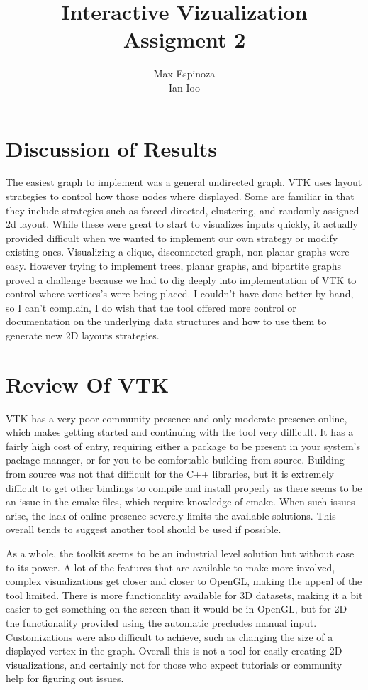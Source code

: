 \documentclass[11pt]{article}
\title{\textbf{Interactive Vizualization}
\\
\normalsize{Assigment 2}
}
\author{Max Espinoza\\
		Ian Ioo}
\begin{document}
\maketitle


\section{Discussion of Results}

The easiest graph to implement was a general undirected graph. VTK uses layout strategies to control how those nodes where displayed. Some are familiar in that they include strategies such as forced-directed, clustering, and randomly assigned 2d layout. While these were great to start to visualizes inputs quickly, it actually provided difficult when we wanted to implement our own strategy or modify existing ones. Visualizing a clique, disconnected graph, non planar graphs were easy. However trying to implement trees, planar graphs, and bipartite graphs proved a challenge because we had to dig deeply into implementation of VTK to control where vertices's were being placed. I couldn't have done better by hand, so I can't complain, I do wish that the tool offered more control or documentation on the underlying data structures and how to use them to generate new 2D layouts strategies.



\section{Review Of VTK}

    VTK has a very poor community presence and only moderate presence online, which makes getting started and continuing with the tool very difficult.  It has a fairly high cost of entry, requiring either a package to be present in your system's package manager, or for you to be comfortable building from source.  Building from source was not that difficult for the C++ libraries, but it is extremely difficult to get other bindings to compile and install properly as there seems to be an issue in the cmake files, which require knowledge of cmake.  When such issues arise, the lack of online presence severely limits the available solutions.  This overall tends to suggest another tool should be used if possible.

    As a whole, the toolkit seems to be an industrial level solution but without ease to its power.  A lot of the features that are available to make more involved, complex visualizations get closer and closer to OpenGL, making the appeal of the tool limited.  There is more functionality available for 3D datasets, making it a bit easier to get something on the screen than it would be in OpenGL, but for 2D the functionality provided using the automatic precludes manual input.  Customizations were also difficult to achieve, such as changing the size of a displayed vertex in the graph.  Overall this is not a tool for easily creating 2D visualizations, and certainly not for those who expect tutorials or community help for figuring out issues.
\end{document}
